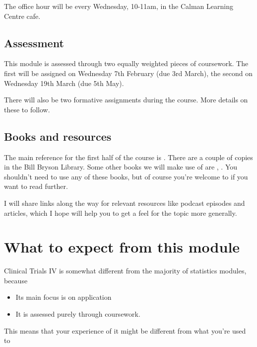 \documentclass[
  openany]{book}
\providecommand{\tightlist}{%
  \setlength{\itemsep}{0pt}\setlength{\parskip}{0pt}}
\theoremstyle{definition}
\theoremstyle{definition}
\theoremstyle{definition}
\theoremstyle{definition}
\theoremstyle{remark}
\begin{document}
The office hour will be every Wednesday, 10-11am, in the Calman Learning Centre cafe.

\subsection*{Assessment}\label{assessment}

This module is assessed through two equally weighted pieces of coursework. The first will be assigned on Wednesday 7th February (due 3rd March), the second on Wednesday 19th March (due 5th May).

There will also be two formative assignments during the course. More details on these to follow.

\subsection*{Books and resources}\label{books-and-resources}

The main reference for the first half of the course is \citet{matthews2006introduction}. There are a couple of copies in the Bill Bryson Library. Some other books we will make use of are \citet{hulley2013designing}, \citet{hayes2017cluster}. You shouldn't need to use any of these books, but of course you're welcome to if you want to read further.

I will share links along the way for relevant resources like podcast episodes and articles, which I hope will help you to get a feel for the topic more generally.

\section*{What to expect from this module}\label{what-to-expect-from-this-module}

Clinical Trials IV is somewhat different from the majority of statistics modules, because

\begin{itemize}
\tightlist
\item
  Its main focus is on application
\item
  It is assessed purely through coursework.
\end{itemize}

This means that your experience of it might be different from what you're used to
\end{document}
